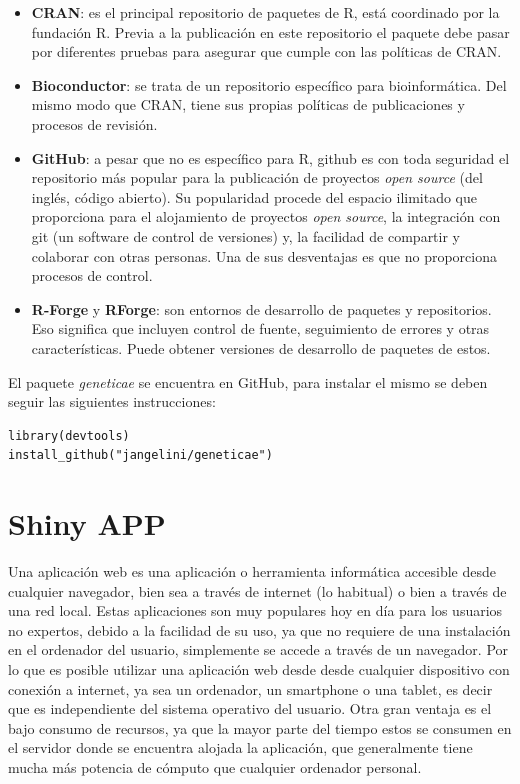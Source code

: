\begin{itemize}
\item \textbf{CRAN}: es el principal repositorio de paquetes de R, está coordinado por la fundación R. Previa a la publicación en este repositorio el paquete debe pasar por diferentes pruebas para asegurar que cumple con las políticas de CRAN.

\item \textbf{Bioconductor}: se trata de un repositorio específico para bioinformática. Del mismo modo que CRAN, tiene sus propias políticas de publicaciones y procesos de revisión.

\item \textbf{GitHub}: a pesar que no es específico para R, github es con toda seguridad el repositorio más popular para la publicación de proyectos \emph{open source} (del inglés, código abierto). Su popularidad procede del espacio ilimitado que proporciona para el alojamiento de proyectos \emph{open source}, la integración con git (un software de control de versiones) y, la facilidad de compartir y colaborar con otras personas. Una de sus desventajas es que no proporciona procesos de control.

\item \textbf{R-Forge} y \textbf{RForge}: son entornos de desarrollo de paquetes y repositorios. Eso significa que incluyen control de fuente, seguimiento de errores y otras características. Puede obtener versiones de desarrollo de paquetes de estos.
\end{itemize}

El paquete \emph{geneticae} se encuentra en GitHub, para instalar el mismo se deben seguir las siguientes instrucciones:\\


\begin{lstlisting}
library(devtools)
install_github("jangelini/geneticae") 
\end{lstlisting}






\section{Shiny APP}
Una aplicación web es una aplicación o herramienta informática accesible desde cualquier navegador, bien sea a través de internet (lo habitual) o bien a través de una red local. 
Estas aplicaciones son muy populares hoy en día para los usuarios no expertos, debido a la facilidad de su uso, ya que no requiere de una instalación en el ordenador del usuario, simplemente se accede a través de un navegador. Por lo que es posible utilizar una aplicación web desde desde cualquier dispositivo con conexión a internet, ya sea un ordenador, un smartphone o una tablet, es decir que es independiente del sistema operativo del usuario. Otra gran ventaja es el bajo consumo de recursos, ya que la mayor parte del tiempo estos se consumen en el servidor donde se encuentra alojada la aplicación, que generalmente tiene mucha más potencia de cómputo que cualquier ordenador personal.

